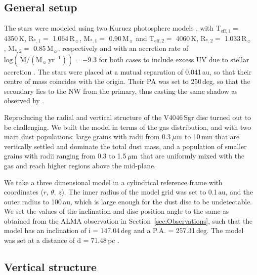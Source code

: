\documentclass[fleqn,usenatbib,useAMS]{mnras}
\begin{document}
\subsection{General setup}

The stars were modeled using two Kurucz photosphere models \citep{1979ApJS...40....1K, 1997A&A...318..841C}, with T$_{\mathrm{eff},1} =$ 4350\,K, R$_{*,1} =$ 1.064\,R$_{\sun}$, M$_{*,1} =$ 0.90\,M$_{\sun}$ and T$_{\mathrm{eff},2} =$ 4060\,K, R$_{*,2} =$ 1.033\,R$_{\sun}$, M$_{*,2} =$ 0.85\,M$_{\sun}$, respectively and with an accretion rate of $\mathrm{log}(\,\dot{\mathrm{M}}/(\mathrm{M}_{\sun}\,\mathrm{yr^{-1}})) = -$9.3 for both cases to include excess UV due to stellar accretion \citep{10.1111/j.1365-2966.2011.19366.x}. The stars were placed at a mutual separation of 0.041\,au, so that their centre of mass coincides with the origin. Their PA was set to 250\,deg, so that the secondary lies to the NW from the primary, thus casting the same shadow as observed by \citet{dOrazi}.

Reproducing the radial and vertical structure of the V4046\,Sgr disc turned out to be challenging. We built the model in terms of the gas distribution, and with two main dust populations: large grains with radii from 0.3\,$\hbox{$\mu$m}$ to 10\,mm that are vertically settled and dominate the total dust mass, and a population of smaller grains with radii ranging from 0.3 to 1.5\,$\hbox{$\mu$m}$ that are uniformly mixed with the gas and reach higher regions above the mid-plane.%

We take a three dimensional model in a cylindrical reference frame with coordinates ($r$, $\theta$, $z$). The inner radius of the model grid was set to 0.1\,au, and the outer radius to 100\,au, which is large enough for the dust disc to be undetectable. We set the values of the inclination and disc position angle to the same as obtained from the ALMA observation in Section~\ref{sec:Observations}, such that the model has an inclination of i = 147.04\,deg and a P.A. = 257.31\,deg. The model was set at a distance of d = 71.48\,pc \citep{gaiacollaboration2021gaia}.

\subsection{Vertical structure}
\end{document}
